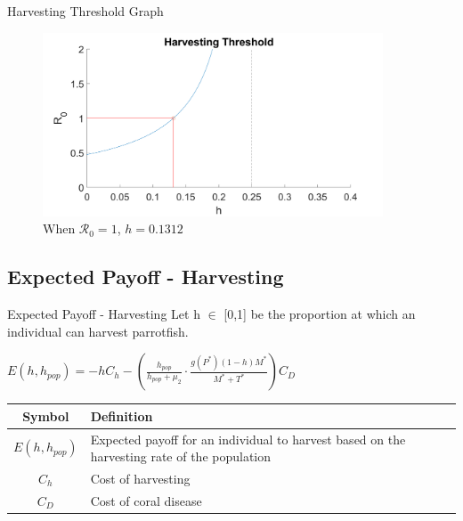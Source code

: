\documentclass{beamer}
\begin{document}
\begin{frame}{Harvesting Threshold Graph}
    \begin{figure}
        \centering
        \includegraphics[width = 0.9\textwidth]{Latex/Figures/Graphs/threshold_graph.png}
        \caption{When $\mathscr{R}_0 = 1$, $h = 0.1312$}
        \label{fig:threshold}
    \end{figure}
\end{frame}

\subsection{Expected Payoff - Harvesting}
\begin{frame}{Expected Payoff - Harvesting}
    Let h $\in$ [0,1] be the proportion at which an individual can harvest parrotfish.
    \begin{center}
    $\displaystyle {E(h, h_{pop}) = -hC_{h} - \left( \frac{h_{pop}}{h_{pop} + \mu_{2}} \cdot \frac{g(P^{*})(1-h)M^{*}}{M^{*} + T^{*}} \right) C_{D}}$ \\
    
    \vspace{0.6cm}
    
    \begin{table}[H]
        \centering
        \begin{tabular}{c|p{8cm}}
             Symbol & Definition \\
             \hline
             $E(h, h_{pop})$ & Expected payoff for an individual to harvest based on the harvesting rate of the population \\
             $C_{h}$ & Cost of harvesting \\
             $C_{D}$ & Cost of coral disease \\
        \end{tabular}
        \label{tab:my_label}
    \end{table}
    \end{center}
\end{frame}
\end{document}
